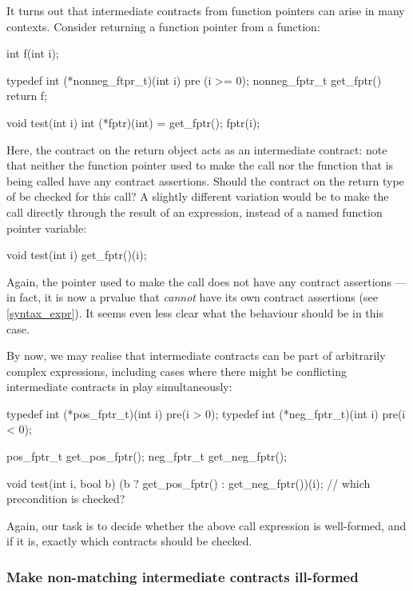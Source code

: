 It turns out that intermediate contracts from function pointers can arise in many contexts. Consider returning a function pointer from a function:
\begin{codeblock}
int f(int i);

typedef int (*nonneg_ftpr_t)(int i) pre (i >= 0);
nonneg_fptr_t get_fptr() { return f; }

void test(int i) {
  int (*fptr)(int) = get_fptr();
  fptr(i);
}
\end{codeblock}
Here, the contract on the return object acts as an intermediate contract: note that neither the function pointer  used to make the call nor the function  that is being called have any contract assertions. Should the contract on the return type of  be checked for this call? A slightly different variation would be to make the call directly through the result of an expression, instead of a named function pointer variable:
\begin{codeblock}
void test(int i) {
  get_fptr()(i);
}
\end{codeblock}
Again, the pointer used to make the call does not have any contract assertions --- in fact, it is now a prvalue that \emph{cannot} have its own contract assertions (see \ref{syntax_expr}). It  seems even less clear what the behaviour should be in this case.

By now, we may realise that intermediate contracts can be part of arbitrarily complex expressions, including cases where there might be conflicting intermediate contracts in play simultaneously:
\begin{codeblock}
typedef int (*pos_fptr_t)(int i) pre(i > 0);
typedef int (*neg_fptr_t)(int i) pre(i < 0);

pos_fptr_t get_pos_fptr();
neg_fptr_t get_neg_fptr();

void test(int i, bool b) {
  (b ? get_pos_fptr() : get_neg_fptr())(i);  // which precondition is checked?
}
\end{codeblock}
Again, our task is to decide whether the above call expression is well-formed, and if it is, exactly which contracts should be checked.


\subsubsection{Make non-matching intermediate contracts ill-formed}

